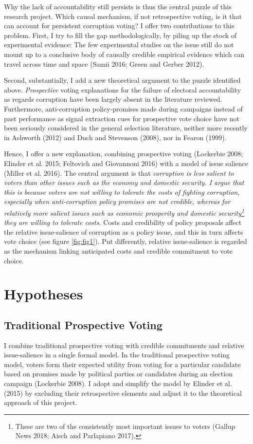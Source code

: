 \documentclass[11pt]{article}
\begin{document}
Why the lack of accountability still persists is thus the central puzzle of this research project. Which causal mechanism, if not retrospective voting, is it that can account for persistent corruption voting? I offer two contributions to this problem. First, I try to fill the gap methodologically, by piling up the stock of experimental evidence: The few experimental studies on the issue still do not mount up to a conclusive body of causally credible empirical evidence which can travel across time and space (Samii 2016; Green and Gerber 2012).

Second, substantially, I add a new theoretical argument to the puzzle identified above. \textit{Prospective} voting explanations for the failure of electoral accountability as regards corruption have been largely absent in the literature reviewed. Furthermore, anti-corruption policy-promises made during campaigns instead of past performance as signal extraction cues for prospective vote choice have not been seriously considered in the general selection literature, neither more recently in Ashworth (2012) and Duch and Stevenson (2008), nor in Fearon (1999).

Hence, I offer a new explanation, combining prospective voting (Lockerbie 2008; Elinder et al. 2015; Feltovich and Giovannoni 2016) with a model of issue salience (Miller et al. 2016). The central argument is that \textit{corruption is less salient to voters than other issues such as the economy and domestic security. I argue that this is because voters are not willing to tolerate the costs of fighting corruption, especially when anti-corruption policy promises are not credible, whereas for relatively more salient issues such as economic prosperity and domestic security\footnote{These are two of the consistently most important issues to voters (Gallup News 2018; Aisch and Parlapiano 2017).} they are willing to tolerate costs.} Costs and credibility of policy proposals affect the relative issue-salience of corruption as a policy issue, and this in turn affects vote choice (see figure \ref{fig:fig1}). Put differently, relative issue-salience is regarded as the mechanism linking anticipated costs and credible commitment to vote choice.

\newpage
\section{Hypotheses}
\subsection{Traditional Prospective Voting}
I combine traditional prospective voting with credible commitments and relative issue-salience in a single formal model. In the traditional prospective voting model, voters form their expected utility from voting for a particular candidate based on promises made by political parties or candidates during an election campaign (Lockerbie 2008). I adopt and simplify the model by Elinder et al. (2015) by excluding their retrospective elements and adjust it to the theoretical approach of this project.
\end{document}
